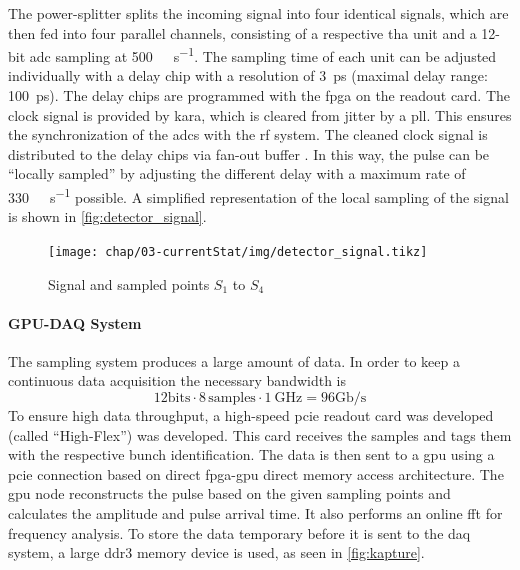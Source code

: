 The power-splitter splits the incoming signal into four identical signals, which are then fed into four parallel channels, consisting of a respective \gls{tha} unit and a 12-bit \gls{adc} sampling at \SI{500}{\mega\sample\per\second}. 
The sampling time of each unit can be adjusted individually with a delay chip with a resolution of \SI{3}{\pico \second} (maximal delay range: \SI{100}{\pico \second}). 
The delay chips are programmed with the \gls{fpga} on the readout card.
The clock signal is provided by \gls{kara}, which is cleared from jitter by a \gls{pll}. 
This ensures the synchronization of the \glspl{adc} with the \gls{rf} system. 
The cleaned clock signal is distributed to the delay chips via fan-out buffer \cite{caselleKAP}.
In this way, the pulse can be ``locally sampled'' by adjusting the different delay with a maximum rate of \SI{330}{\giga\sample\per\second} possible. 
A simplified representation of the local sampling of the signal is shown in \autoref{fig:detector_signal}.
\begin{figure}[tbh]
	\centering
	\texttt{[image: chap/03-currentStat/img/detector\_signal.tikz]}
	\caption{Signal and sampled points $S_1$ to $S_4$}
	\label{fig:detector_signal}
\end{figure}

\paragraph{GPU-DAQ System}
The sampling system produces a large amount of data.
In order to keep a continuous data  acquisition the necessary bandwidth is 
\begin{equation}
	12 \text{bits} \cdot 8 \, \text{samples} \cdot \SI{1}{\GHz} = 96 \text{Gb/s}
\end{equation}
To ensure high data throughput, a high-speed \gls{pcie} readout card was developed (called ``High-Flex'') was developed.
This card receives the samples and tags them with the respective bunch identification. 
The data is then sent to a \gls{gpu} using a \gls{pcie} connection based on direct \gls{fpga}-\gls{gpu} direct memory access architecture.
The \gls{gpu} node reconstructs the pulse based on the given sampling points and calculates the amplitude and pulse arrival time. 
It also performs an online \gls{fft} for frequency analysis.
To store the data temporary before it is sent to the \gls{daq} system, a large \gls{ddr3} memory device is used, as seen in \autoref{fig:kapture}. \cite{caselleKAP}

